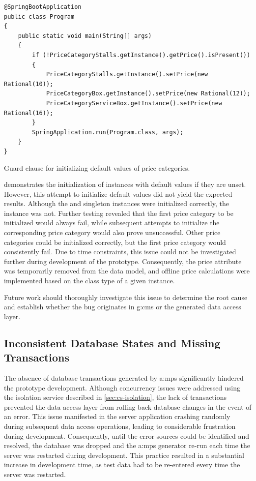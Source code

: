 \begin{listing}[H]
\begin{verbatim}
@SpringBootApplication
public class Program 
{
    public static void main(String[] args) 
    {
        if (!PriceCategoryStalls.getInstance().getPrice().isPresent())
        {
            PriceCategoryStalls.getInstance().setPrice(new Rational(10));
            PriceCategoryBox.getInstance().setPrice(new Rational(12));
            PriceCategoryServiceBox.getInstance().setPrice(new Rational(16));
        }
        SpringApplication.run(Program.class, args);
    }
}
\end{verbatim}
\caption{Guard clause for initializing default values of price categories.}
\label{lst:price-category-initialization}
\end{listing}

 demonstrates the initialization of  instances with default values if they are unset. However, this attempt to initialize default values did not yield the expected results. Although the  and  singleton instances were initialized correctly, the  instance was not. Further testing revealed that the first price category to be initialized would always fail, while subsequent attempts to initialize the corresponding price category would also prove unsuccessful. Other price categories could be initialized correctly, but the first price category would consistently fail. Due to time constraints, this issue could not be investigated further during development of the prototype. Consequently, the price attribute was temporarily removed from the data model, and offline price calculations were implemented based on the class type of a given  instance.

Future work should thoroughly investigate this issue to determine the root cause and establish whether the bug originates in \gls{g:cms} or the generated data access layer.

\subsection{Inconsistent Database States and Missing Transactions}

The absence of database transactions generated by \gls{a:mps} significantly hindered the prototype development. Although concurrency issues were addressed using the isolation service described in \cref{sec:cs-isolation}, the lack of transactions prevented the data access layer from rolling back database changes in the event of an error. This issue manifested in the server application crashing randomly during subsequent data access operations, leading to considerable frustration during development. Consequently, until the error sources could be identified and resolved, the database was dropped and the \gls{a:mps} generator re-run each time the server was restarted during development. This practice resulted in a substantial increase in development time, as test data had to be re-entered every time the server was restarted.

